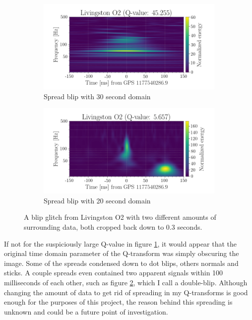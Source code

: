 \documentclass[a4paper]{article}
\begin{document}
\begin{figure}[h!]
	\centering
	\begin{subfigure}{.49\textwidth}
		\centering
		\includegraphics[width=1\linewidth]{spread_ex_30s}
		\caption{Spread blip with 30 second domain}
		\label{fig:spread_30}
	\end{subfigure}
	\begin{subfigure}{.49\textwidth}
		\centering
		\includegraphics[width=1\linewidth]{spread_ex_20s}
		\caption{Spread blip with 20 second domain}
		\label{fig:spread_20}
	\end{subfigure}
	\caption{A blip glitch from Livingston O2 with two different amounts of surrounding data, both cropped back down to 0.3 seconds.}%
	\label{fig:spread_ex}
\end{figure}

If not for the suspiciously large Q-value in figure \ref{fig:spread_30}, it would appear that the original time domain parameter of the Q-transform was simply obscuring the image. Some of the spreads condensed down to dot blips, others normals and sticks. A couple spreads even contained two apparent signals within 100 milliseconds of each other, such as figure \ref{fig:spread_20}, which I call a double-blip. Although changing the amount of data to get rid of spreading in my Q-transforms is good enough for the purposes of this project, the reason behind this spreading is unknown and could be a future point of investigation.
\end{document}
